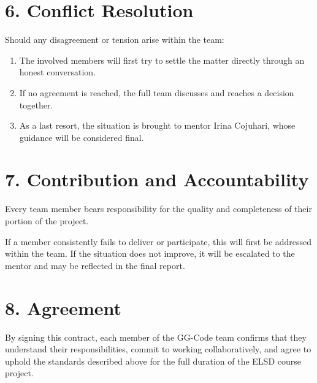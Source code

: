 \documentclass[12pt, a4paper]{article}
\begin{document}
\section{6. Conflict Resolution}

Should any disagreement or tension arise within the team:

\begin{enumerate}[leftmargin=2em]
    \item The involved members will first try to settle the matter directly through an honest conversation.
    \item If no agreement is reached, the full team discusses and reaches a decision together.
    \item As a last resort, the situation is brought to mentor Irina Cojuhari, whose guidance will be considered final.
\end{enumerate}

\section{7. Contribution and Accountability}

Every team member bears responsibility for the quality and completeness of their portion of
the project.

If a member consistently fails to deliver or participate, this will first be addressed within
the team. If the situation does not improve, it will be escalated to the mentor and may be
reflected in the final report.

\section{8. Agreement}

By signing this contract, each member of the GG-Code team confirms that they understand their
responsibilities, commit to working collaboratively, and agree to uphold the standards described
above for the full duration of the ELSD course project.

\vspace{2em}
\end{document}
